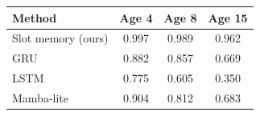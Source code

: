 \begin{tabular}{lccc}
\toprule
Method & Age 4 & Age 8 & Age 15\\
\midrule
\rowcolor{MemCream}Slot memory (ours) & 0.997 & 0.989 & 0.962\\
GRU & 0.882 & 0.857 & 0.669\\
LSTM & 0.775 & 0.605 & 0.350\\
Mamba-lite & 0.904 & 0.812 & 0.683\\
\bottomrule
\end{tabular}
